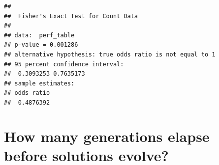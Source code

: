 \documentclass[]{book}
\newenvironment{Shaded}{\begin{snugshade}}{\end{snugshade}}
\newcommand{\DecValTok}[1]{\textcolor[rgb]{0.00,0.00,0.81}{#1}}
\newcommand{\KeywordTok}[1]{\textcolor[rgb]{0.13,0.29,0.53}{\textbf{#1}}}
\newcommand{\NormalTok}[1]{#1}
\newcommand{\OperatorTok}[1]{\textcolor[rgb]{0.81,0.36,0.00}{\textbf{#1}}}
\newcommand{\StringTok}[1]{\textcolor[rgb]{0.31,0.60,0.02}{#1}}
\begin{document}
\begin{verbatim}
## 
##  Fisher's Exact Test for Count Data
## 
## data:  perf_table
## p-value = 0.001286
## alternative hypothesis: true odds ratio is not equal to 1
## 95 percent confidence interval:
##  0.3093253 0.7635173
## sample estimates:
## odds ratio 
##  0.4876392
\end{verbatim}

\hypertarget{how-many-generations-elapse-before-solutions-evolve-3}{%
\section{How many generations elapse before solutions evolve?}\label{how-many-generations-elapse-before-solutions-evolve-3}}

\begin{Shaded}
\end{Shaded}
\end{document}
